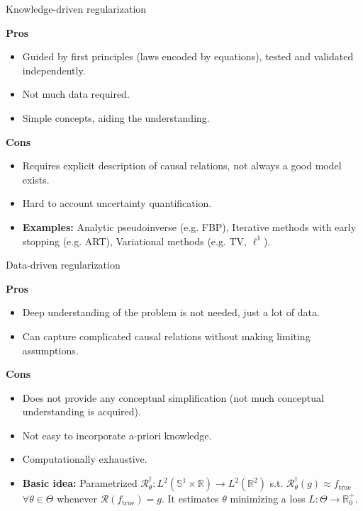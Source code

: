 \begin{frame}{Knowledge-driven regularization}
\begin{block}{\textbf{Pros \Smiley{}}}
\begin{itemize}
\item Guided by first principles (laws encoded by equations), tested and validated independently.
\item Not much data required.
\item Simple concepts, aiding the understanding.
\end{itemize}
\end{block}
\pause
\begin{block}{\textbf{Cons \Frowny{}}}
\begin{itemize}
\item Requires explicit description of causal relations, not always a good model exists.
\item Hard to account uncertainty quantification.
\end{itemize}
\end{block}
\pause
\begin{itemize}
\item \textbf{Examples:} Analytic pseudoinverse (e.g. FBP), Iterative methods with early stopping (e.g. ART), Variational methods (e.g. TV, $\ell^1$). 
\end{itemize}
\end{frame}

\begin{frame}{Data-driven regularization}
\begin{block}{\textbf{Pros \Smiley{}}}
\begin{itemize}
\item Deep understanding of the problem is not needed, just a lot of data.
\item Can capture complicated causal relations without making limiting assumptions.
\end{itemize}
\end{block}

\pause

\begin{block}{\textbf{Cons \Frowny{}}}
\begin{itemize}
\item Does not provide any conceptual simplification (not much conceptual understanding is acquired).
\item Not easy to incorporate a-priori knowledge. 
\item Computationally exhaustive.
\end{itemize}
\end{block}

\pause

\begin{itemize}
\item \textbf{Basic idea:} Parametrized $\mathcal{R}^{\dagger}_{\theta}: L^2(\mathbb{S}^1\times\mathbb{R})\longrightarrow L^2(\mathbb{R}^2)$ s.t. $\mathcal{R}^{\dagger}_{\theta}(g)\approx f_{\text{true}}$ $\forall \theta\in\Theta$ whenever $\mathcal{R}(f_{\text{true}})=g$. It estimates $\theta$ minimizing a loss $L:\Theta\longrightarrow \mathbb{R}^+_{0}$.
\end{itemize}
\end{frame}

